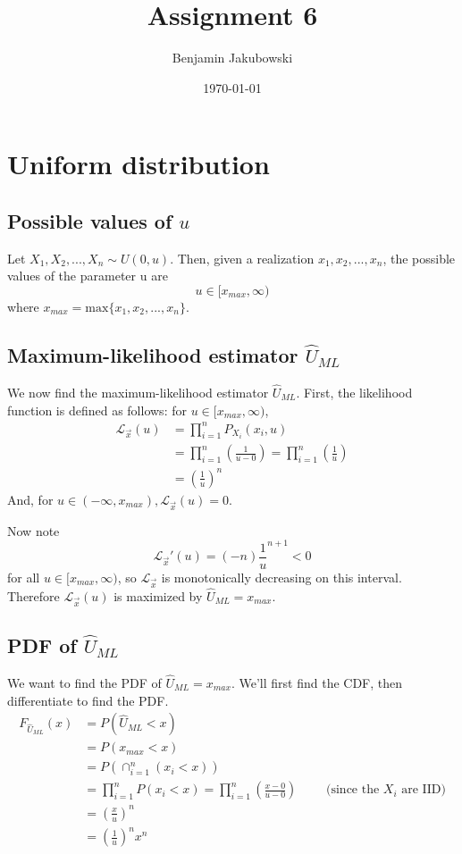 \documentclass[paper=a4, fontsize=11pt]{scrartcl} %
\title{	Assignment 6}
\author{Benjamin Jakubowski} %
\date{\normalsize\today} %
\numberwithin{equation}{section} %
\numberwithin{figure}{section} %
\numberwithin{table}{section} %
\begin{document}
\maketitle %


\section{Uniform distribution}

\subsection{Possible values of $u$}

Let $X_1, X_2, ..., X_n \sim U(0,u)$. Then, given a realization $x_1, x_2, ..., x_n$, the possible values of the parameter u are
\[u \in [x_{max}, \infty)\]
where $x_{max} = \textrm{max} \{x_1, x_2, ..., x_n\}$.

\subsection{Maximum-likelihood estimator $\hat{U}_{ML}$}

We now find the maximum-likelihood estimator $\hat{U}_{ML}$. First, the likelihood function is defined as follows: for $u \in [x_{max}, \infty)$,
\begin{align*}
\mathcal{L}_{\vec{x}} (u) &= \prod_{i = 1}^{n} P_{X_i}(x_i, u) \\
   &= \prod_{i = 1}^{n} \left(\frac{1}{u-0}\right) = \prod_{i=1}^{n} \left(\frac{1}{u}\right) \\
   &= \left(\frac{1}{u}\right)^n
\end{align*}
And, for $u \in (-\infty, x_{max}), \mathcal{L}_{\vec{x}}(u) = 0$.

Now note
\[\mathcal{L}_{\vec{x}}' (u) = (-n) \frac{1}{u}^{n+1} < 0\]
for all $u \in [x_{max}, \infty)$, so $\mathcal{L}_{\vec{x}}$ is monotonically decreasing on this interval. Therefore  $\mathcal{L}_{\vec{x}}(u)$ is maximized by $\hat{U}_{ML} = x_{max}$.

\subsection{PDF of $\hat{U}_{ML}$}
We want to find the PDF of $\hat{U}_{ML} = x_{max}$. We'll first find the CDF, then differentiate to find the PDF.
\begin{align*}
F_{\hat{U}_{ML}}(x) &= P(\hat{U}_{ML} < x) \\
   &= P(x_{max} < x) \\
   &= P\left( \cap_{i = 1}^{n} \left(x_i < x \right)\right) \\
   &= \prod_{i = 1}^{n} P(x_i < x) = \prod_{i = 1} ^{n} \left( \frac{x-0}{u-0}\right) \qquad{} \textrm{ (since the $X_i$ are IID)} \\
   &= \left(\frac{x}{u}\right)^n \\
   &= \left(\frac{1}{u}\right)^n x^n
\end{align*}
\end{document}
